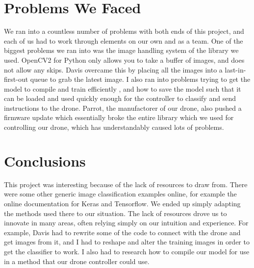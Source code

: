 \documentclass[12pt]{article}
\begin{document}
\section{Problems We Faced}
{
	We ran into a countless number of problems with both ends of this project, and each of us had to work through elements on our own and as a team.
	One of the biggest problems we ran into was the image handling system of the library we used. 
	OpenCV2 for Python only allows you to take a buffer of images, and does not allow any skips. 
	Davis overcame this by placing all the images into a last-in-first-out queue to grab the latest image.  
	I also ran into problems trying to get the model to compile and train efficiently , and how to save the model such that it can be loaded and used quickly enough for the controller to classify and send instructions to the drone. 
	Parrot, the manufactorer of our drone, also pushed a firmware update which essentially broke the entire library which we used for controlling our drone, which has understandably caused lots of problems. 
}

\section{Conclusions}
{
	This project was interesting because of the lack of resources to draw from.
	There were some other generic image classification examples online, for example the online documentation for Keras and Tensorflow. 
	We ended up simply adapting the methods used there to our situation. 
	The lack of resources drove us to innovate in many areas, often relying simply on our intuition and experience. 
	For example, Davis had to rewrite some of the code to connect with the drone and get images from it, and I had to reshape and alter the training images in order to get the classifier to work. 
	I also had to research how to compile our model for use in a method that our drone controller could use.
}
\end{document}
